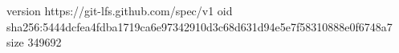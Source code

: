 version https://git-lfs.github.com/spec/v1
oid sha256:5444dcfea4fdba1719ca6e97342910d3c68d631d94e5e7f58310888e0f6748a7
size 349692
